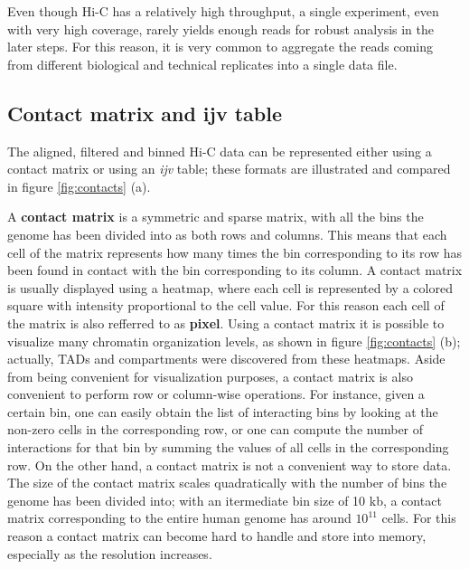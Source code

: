 Even though Hi-C has a relatively high throughput, a single experiment, even with very high coverage, rarely yields enough reads for robust analysis in the later steps. For this reason, it is very common to aggregate the reads coming from different biological and technical replicates into a single data file.

\subsection{Contact matrix and ijv table}

The aligned, filtered and binned Hi-C data can be represented either using a contact matrix or using an \emph{ijv} table; these formats are illustrated and compared in figure \ref{fig:contacts} (a).

A \textbf{contact matrix} is a symmetric and sparse matrix, with all the bins the genome has been divided into as both rows and columns. This means that each cell of the matrix represents how many times the bin corresponding to its row has been found in contact with the bin corresponding to its column. A contact matrix is usually displayed using a heatmap, where each cell is represented by a colored square with intensity proportional to the cell value. For this reason each cell of the matrix is also refferred to as \textbf{pixel}. Using a contact matrix it is possible to visualize many chromatin organization levels, as shown in figure \ref{fig:contacts} (b); actually, TADs and compartments were discovered from these heatmaps. Aside from being convenient for visualization purposes, a contact matrix is also convenient to perform row or column-wise operations. For instance, given a certain bin, one can easily obtain the list of interacting bins by looking at the non-zero cells in the corresponding row, or one can compute the number of interactions for that bin by summing the values of all cells in the corresponding row. On the other hand, a contact matrix is not a convenient way to store data. The size of the contact matrix scales quadratically with the number of bins the genome has been divided into; with an itermediate bin size of 10 kb, a contact matrix corresponding to the entire human genome has around $10^{11}$ cells. For this reason a contact matrix can become hard to handle and store into memory, especially as the resolution increases.

